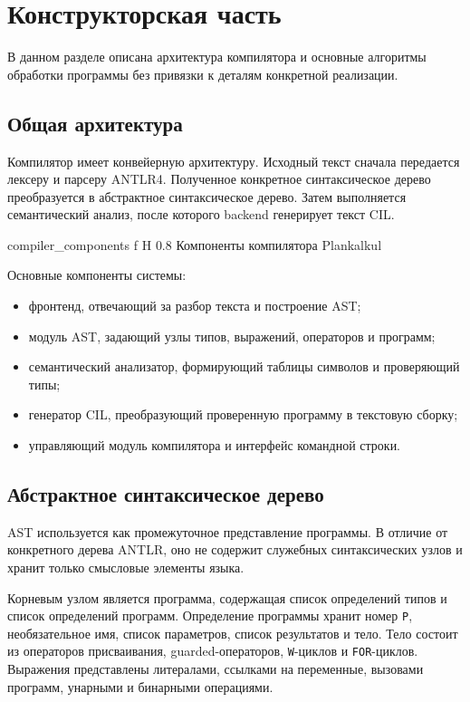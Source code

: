 \chapter{Конструкторская часть}

В данном разделе описана архитектура компилятора и основные алгоритмы обработки программы без привязки к деталям конкретной реализации.

\section{Общая архитектура}
Компилятор имеет конвейерную архитектуру.
Исходный текст сначала передается лексеру и парсеру ANTLR4.
Полученное конкретное синтаксическое дерево преобразуется в абстрактное синтаксическое дерево.
Затем выполняется семантический анализ, после которого backend генерирует текст CIL.

	{compiler_components}
	{f}
	{H}
	{0.8\textwidth}
	{Компоненты компилятора Plankalkul}

Основные компоненты системы:
\begin{itemize}
	\item фронтенд, отвечающий за разбор текста и построение AST;
	\item модуль AST, задающий узлы типов, выражений, операторов и программ;
	\item семантический анализатор, формирующий таблицы символов и проверяющий типы;
	\item генератор CIL, преобразующий проверенную программу в текстовую сборку;
	\item управляющий модуль компилятора и интерфейс командной строки.
\end{itemize}

\section{Абстрактное синтаксическое дерево}
AST используется как промежуточное представление программы.
В отличие от конкретного дерева ANTLR, оно не содержит служебных синтаксических узлов и хранит только смысловые элементы языка.

Корневым узлом является программа, содержащая список определений типов и список определений программ.
Определение программы хранит номер \texttt{P}, необязательное имя, список параметров, список результатов и тело.
Тело состоит из операторов присваивания, guarded-операторов, \texttt{W}-циклов и \texttt{FOR}-циклов.
Выражения представлены литералами, ссылками на переменные, вызовами программ, унарными и бинарными операциями.

